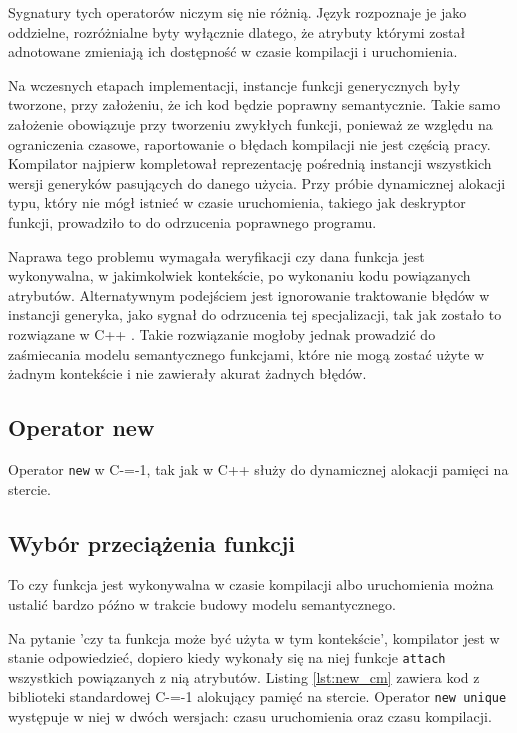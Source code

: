 Sygnatury tych operatorów niczym się nie różnią.
Język rozpoznaje je jako oddzielne, rozróżnialne byty wyłącznie dlatego, że atrybuty którymi został adnotowane zmieniają ich dostępność w czasie kompilacji i uruchomienia.

Na wczesnych etapach implementacji, instancje funkcji generycznych były tworzone, przy założeniu, że ich kod będzie poprawny semantycznie.
Takie samo założenie obowiązuje przy tworzeniu zwykłych funkcji, ponieważ ze względu na ograniczenia czasowe, raportowanie o błędach kompilacji nie jest częścią pracy.
Kompilator najpierw kompletował reprezentację pośrednią instancji wszystkich wersji generyków pasujących do danego użycia.
Przy próbie dynamicznej alokacji typu, który nie mógł istnieć w czasie uruchomienia, takiego jak deskryptor funkcji, prowadziło to do odrzucenia poprawnego programu.

Naprawa tego problemu wymagała weryfikacji czy dana funkcja jest wykonywalna, w jakimkolwiek kontekście, po wykonaniu kodu powiązanych atrybutów.
Alternatywnym podejściem jest ignorowanie traktowanie błędów w instancji generyka, jako sygnał do odrzucenia tej specjalizacji, tak jak zostało to rozwiązane w C++ \cite{cppTemplatesCompleteGuide}.
Takie rozwiązanie mogłoby jednak prowadzić do zaśmiecania modelu semantycznego funkcjami, które nie mogą zostać użyte w żadnym kontekście i nie zawierały akurat żadnych błędów.
\subsection{Operator new}
\label{operator_new}
Operator \lstinline{new} w C-=-1, tak jak w C++ służy do dynamicznej alokacji pamięci na stercie.

\subsection{Wybór przeciążenia funkcji}
\label{Function_overload_resolution}
To czy funkcja jest wykonywalna w czasie kompilacji albo uruchomienia można ustalić bardzo późno w trakcie budowy modelu semantycznego.

Na pytanie 'czy ta funkcja może być użyta w tym kontekście', kompilator jest w stanie odpowiedzieć, dopiero kiedy wykonały się na niej funkcje \lstinline{attach} wszystkich powiązanych z nią atrybutów.
Listing \ref{lst:new_cm} zawiera kod z biblioteki standardowej C-=-1 alokujący pamięć na stercie.
Operator \lstinline{new unique} występuje w niej w dwóch wersjach: czasu uruchomienia oraz czasu kompilacji.

